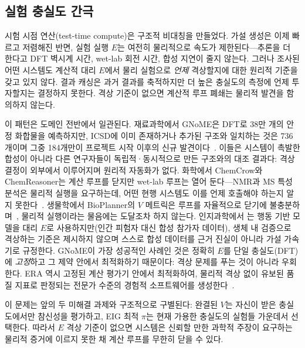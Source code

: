 \documentclass[11pt]{article}
\begin{document}
\subsection{실험 충실도 간극}
\label{sec:op4}

시험 시점 연산(test-time compute)은 구조적 비대칭을 만들었다. 가설 생성은 이제 빠르고 저렴해진 반면, 실험 실행 $E$는 여전히 물리적으로 속도가 제한된다---추론을 더 한다고 DFT 벽시계 시간, wet-lab 회전 시간, 합성 지연이 줄지 않는다. 그러나 조사된 어떤 시스템도 계산적 대리 $E$에서 물리 실험으로 \emph{언제} 격상할지에 대한 원리적 기준을 갖고 있지 않다. 결과 캐싱은 과거 결과를 축적하지만 더 높은 충실도의 측정에 언제 투자할지는 결정하지 못한다. 격상 기준이 없으면 계산적 루프 폐쇄는 물리적 발견을 함의하지 않는다.

이 패턴은 도메인 전반에서 일관된다. 재료과학에서 GNoME은 DFT로 38만 개의 안정 화합물을 예측하지만, ICSD에 이미 존재하거나 추가된 구조와 일치하는 것은 736개이며 그중 184개만이 프로젝트 시작 이후의 신규 발견이다~\citep{merchant2023gnome}. 이들은 시스템이 촉발한 합성이 아니라 다른 연구자들이 독립적·동시적으로 만든 구조와의 대조 결과다: 격상 결정이 외부에서 이루어지며 원리적 자동화가 없다. 화학에서 ChemCrow와 ChemReasoner는 계산 루프를 닫지만 wet-lab 루프는 열어 둔다---NMR과 MS 특성 분석은 물리적 실행을 요구하는데, 어떤 현행 시스템도 이를 언제 호출해야 하는지 알지 못한다~\citep{gromski2019chemical}. 생물학에서 BioPlanner의 $V$ 메트릭은 루프를 자율적으로 닫기에 불충분하며~\citep{odonoghue2023bioplanner}, 물리적 실행이라는 물음에는 도달조차 하지 않는다. 인지과학에서 \citet{jagadish2026cogscidiscovery}는 행동 기반 모델을 대리 $E$로 사용하지만(인간 피험자 대신 합성 참가자 데이터), 생체 내 검증으로 격상하는 기준은 제시하지 않으며 스스로 합성 데이터를 근거 진실이 아니라 가설 가속기로 규정한다. GNoME이 가장 성공적인 사례인 것은 정확히 $E$를 단일 충실도(DFT)에 \emph{고정}하고 그 제약 안에서 최적화하기 때문이다: 격상 문제를 푸는 것이 아니라 우회한다. ERA 역시 고정된 계산 평가기 안에서 최적화하여, 물리적 격상 없이 유보된 품질 지표로 판정되는 전문가 수준의 경험적 소프트웨어를 생성한다~\citep{aygun2026era}.

이 문제는 앞의 두 미해결 과제와 구조적으로 구별된다: 완결된 $V$는 자신이 받은 충실도에서만 참신성을 평가하고, EIG 최적 $\pi$는 현재 가용한 충실도의 실험들 가운데서 선택한다. 따라서 $E$ 격상 기준이 없으면 시스템은 신뢰할 만한 과학적 주장이 요구하는 물리적 증거에 이르지 못한 채 계산 루프를 무한히 닫을 수 있다.
\end{document}
